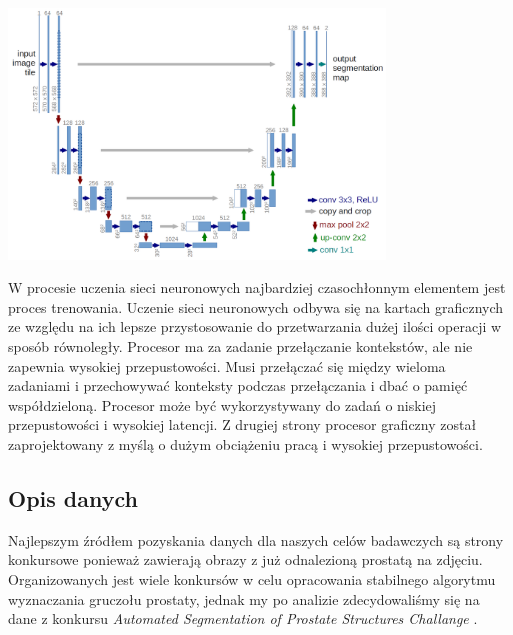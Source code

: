 \documentclass[a4paper,11pt,twoside]{report}
\theoremstyle{definition}
\begin{document}
\begin{minipage}{\linewidth}
	\centering
	\includegraphics[width=10cm]{unet-architecture.png}
\end{minipage}


W procesie uczenia sieci neuronowych najbardziej czasochłonnym elementem jest proces trenowania. Uczenie sieci neuronowych odbywa się na kartach graficznych ze względu na ich lepsze przystosowanie do przetwarzania dużej ilości operacji w sposób równoległy. Procesor ma za zadanie przełączanie kontekstów, ale nie zapewnia wysokiej przepustowości. Musi przełączać się między wieloma zadaniami i przechowywać konteksty podczas przełączania i dbać o pamięć współdzieloną. Procesor może być wykorzystywany do zadań o niskiej przepustowości i wysokiej latencji. Z drugiej strony procesor graficzny został zaprojektowany z myślą o dużym obciążeniu pracą i wysokiej przepustowości.

\subsection{Opis danych}

Najlepszym źródłem pozyskania danych dla naszych celów badawczych są strony konkursowe ponieważ zawierają obrazy z już odnalezioną prostatą na zdjęciu. Organizowanych jest wiele konkursów \cite{konkurs} w celu opracowania stabilnego algorytmu wyznaczania gruczołu prostaty, jednak my po analizie zdecydowaliśmy się na dane z konkursu \textit{Automated Segmentation of Prostate Structures Challange} \cite{konkretny}.
\end{document}
